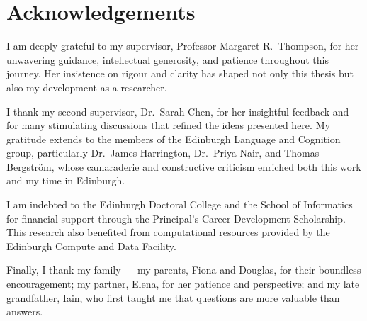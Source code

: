 \chapter*{Acknowledgements}
\thispagestyle{plain}

I am deeply grateful to my supervisor, Professor Margaret R.\ Thompson, for her unwavering
guidance, intellectual generosity, and patience throughout this journey. Her insistence on
rigour and clarity has shaped not only this thesis but also my development as a researcher.

I thank my second supervisor, Dr.\ Sarah Chen, for her insightful feedback and for many
stimulating discussions that refined the ideas presented here. My gratitude extends to the
members of the Edinburgh Language and Cognition group, particularly Dr.\ James Harrington,
Dr.\ Priya Nair, and Thomas Bergström, whose camaraderie and constructive criticism enriched
both this work and my time in Edinburgh.

I am indebted to the Edinburgh Doctoral College and the School of Informatics for financial
support through the Principal's Career Development Scholarship. This research also benefited
from computational resources provided by the Edinburgh Compute and Data Facility.

Finally, I thank my family — my parents, Fiona and Douglas, for their boundless encouragement;
my partner, Elena, for her patience and perspective; and my late grandfather, Iain, who first
taught me that questions are more valuable than answers.

\cleardoublepage

\tableofcontents
\cleardoublepage

\listoffigures
\cleardoublepage

\listoftables
\cleardoublepage

\mainmatter

